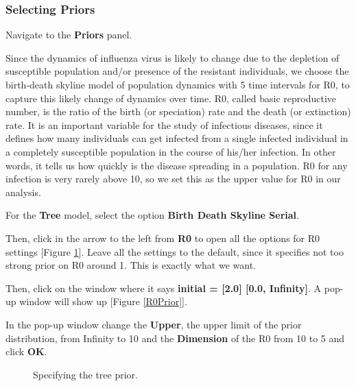 \documentclass[11pt]{article}
\begin{document}
\bigskip
\subsubsection{Selecting Priors}

\begin{framed}
Navigate to the \textbf{Priors} panel.
\end{framed}


Since the dynamics of influenza virus is likely to change due to the depletion of susceptible population and/or presence of the resistant individuals, we choose the birth-death skyline model of population dynamics with 5 time intervals for R0, to capture this likely change of dynamics over time. R0, called basic reproductive number, is the ratio of the birth (or speciation) rate and the death (or extinction) rate. It is an important variable for the study of infectious diseases, since it defines how many individuals can get infected from a single infected individual in a completely susceptible population in the course of his/her infection. In other words, it tells us how quickly is the disease spreading in a population. R0 for any infection is very rarely above 10, so we set this as the upper value for R0 in our analysis.

\begin{framed}
For the \textbf{Tree} model, select the option \textbf{Birth Death Skyline Serial}. 

Then, click in the arrow to the left from \textbf{R0} to open all the options for R0 settings [Figure \ref{treePrior}]. Leave all the settings to the default, since it specifies not too strong prior on R0 around 1. This is exactly what we want. 

Then, click on the window where it says \textbf{initial = [2.0] [0.0, Infinity]}. A pop-up window will show up [Figure \ref{R0Prior}].

In the pop-up window change the \textbf{Upper}, the upper limit of the prior distribution, from Infinity to 10 and the \textbf{Dimension} of the R0 from 10 to 5 and click \textbf{OK}.
\end{framed}

\begin{figure}[h!]
\centering
{}
\caption{\small Specifying the tree prior.}
\label{treePrior}
\end{figure}
\end{document}
